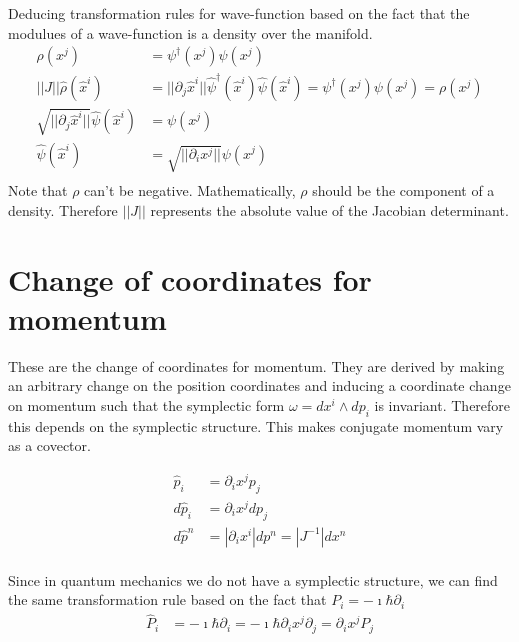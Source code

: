 \documentclass[11pt]{article}
\begin{document}
Deducing transformation rules for wave-function based on the fact that the modulues of a wave-function is a density over the manifold.
\begin{equation}
	\begin{aligned}
		\rho(x^j) &= \psi^\dagger(x^j) \psi(x^j)\\
		||J|| \hat{\rho}(\hat{x}^i) &= || \partial_j \hat{x}^i || \hat{\psi}^\dagger(\hat{x}^i) \hat{\psi}(\hat{x}^i) = \psi^\dagger(x^j) \psi(x^j) = \rho(x^j) \\
		\sqrt{|| \partial_j \hat{x}^i ||} \hat{\psi}(\hat{x}^i) &= \psi(x^j) \\
		\hat{\psi}(\hat{x}^i) &= \sqrt{|| \partial_i x^j ||} \psi(x^j) \\
	\end{aligned}
\end{equation}
Note that $\rho$ can't be negative. Mathematically,  $\rho$ should be the component of a density. Therefore $||J||$ represents the absolute value of the Jacobian determinant.

\section{Change of coordinates for momentum}

These are the change of coordinates for momentum. They are derived by making an arbitrary change on the position coordinates and inducing a coordinate change on momentum such that the symplectic form $\omega = dx^i \wedge dp_i$ is invariant. Therefore this depends on the symplectic structure. This makes conjugate momentum vary as a covector.

\begin{equation}
	\begin{aligned}
		\hat{p}_i &= \partial_i x^j p_j \\
		d \hat{p}_i &= \partial_i x^j d p_j \\
		d\hat{p}^n &= | \partial_i x^i | dp^n = |J^{-1}| dx^n \\
	\end{aligned}
\end{equation}

Since in quantum mechanics we do not have a symplectic structure, we can find the same transformation rule based on the fact that $P_i = -\imath \hbar \partial_i$
\begin{equation}
	\begin{aligned}
		\hat{P}_i &= -\imath \hbar \partial_i = -\imath \hbar \partial_i x^j \partial_j = \partial_i x^j P_j \\
	\end{aligned}
\end{equation}
\end{document}
